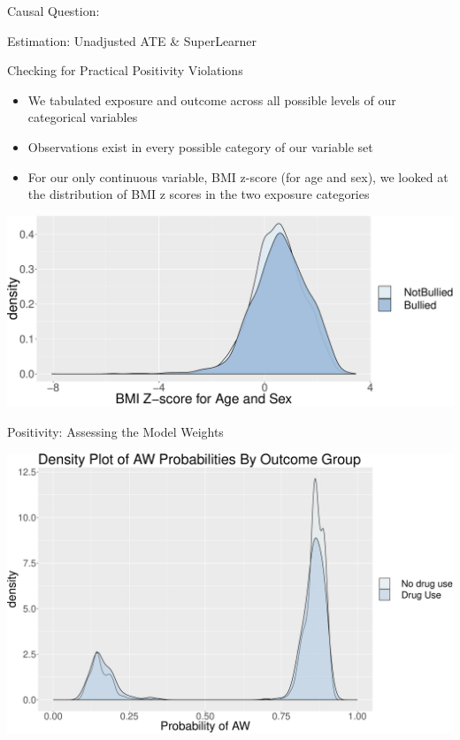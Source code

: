 \documentclass[ignorenonframetext,]{beamer}
\begin{document}
\begin{frame}{Causal Question:}
\begin{block}{Estimation: Unadjusted ATE \& SuperLearner}
\end{block}

\begin{block}{Checking for Practical Positivity Violations}

\begin{itemize}
\item
  We tabulated exposure and outcome across all possible levels of our
  categorical variables
\item
  Observations exist in every possible category of our variable set
\item
  For our only continuous variable, BMI z-score (for age and sex), we
  looked at the distribution of BMI z scores in the two exposure
  categories
\end{itemize}

\includegraphics{Final_Project_Coding_files/figure-beamer/unnamed-chunk-2-1.pdf}

\end{block}

\begin{block}{Positivity: Assessing the Model Weights}

\includegraphics{Final_Project_Coding_files/figure-beamer/unnamed-chunk-3-1.pdf}


\end{block}
\end{frame}
\end{document}
